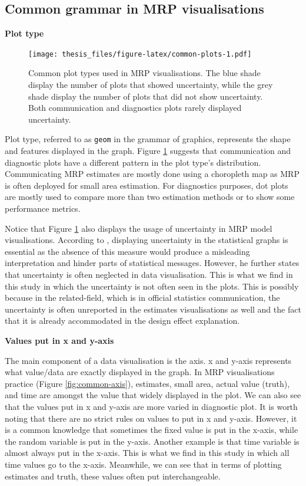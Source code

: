 \documentclass{monashthesis}
\begin{document}
\hypertarget{common-grammar-in-mrp-visualisations}{%
\subsection{Common grammar in MRP visualisations}\label{common-grammar-in-mrp-visualisations}}

\textbf{Plot type}

\begin{figure}
\centering
\texttt{[image: thesis\_files/figure-latex/common-plots-1.pdf]}
\caption{\label{fig:common-plots}Common plot types used in MRP visualisations. The blue shade display the number of plots that showed uncertainty, while the grey shade display the number of plots that did not show uncertainty. Both communication and diagnostics plots rarely displayed uncertainty.}
\end{figure}

Plot type, referred to as \texttt{geom} in the grammar of graphics, represents the shape and features displayed in the graph. Figure \ref{fig:common-plots} suggests that communication and diagnostic plots have a different pattern in the plot type's distribution. Communicating MRP estimates are mostly done using a choropleth map as MRP is often deployed for small area estimation. For diagnostics purposes, dot plots are mostly used to compare more than two estimation methods or to show some performance metrics.

Notice that Figure \ref{fig:common-plots} also displays the usage of uncertainty in MRP model visualisations. According to \textcite{MIDWAY2020100141}, displaying uncertainty in the statistical graphs is essential as the absence of this measure would produce a misleading interpretation and hinder parts of statistical messages. However, he further states that uncertainty is often neglected in data visualisation. This is what we find in this study in which the uncertainty is not often seen in the plots. This is possibly because in the related-field, which is in official statistics communication, the uncertainty is often unreported in the estimates visualisations as well and the fact that it is already accommodated in the design effect explanation.

\textbf{Values put in x and y-axis}

The main component of a data visualisation is the axis. x and y-axis represents what value/data are exactly displayed in the graph. In MRP visualisations practice (Figure \ref{fig:common-axis}), estimates, small area, actual value (truth), and time are amongst the value that widely displayed in the plot. We can also see that the values put in x and y-axis are more varied in diagnostic plot. It is worth noting that there are no strict rules on values to put in x and y-axis. However, it is a common knowledge that sometimes the fixed value is put in the x-axis, while the random variable is put in the y-axis. Another example is that time variable is almost always put in the x-axis. This is what we find in this study in which all time values go to the x-axis. Meanwhile, we can see that in terms of plotting estimates and truth, these values often put interchangeable.
\end{document}
